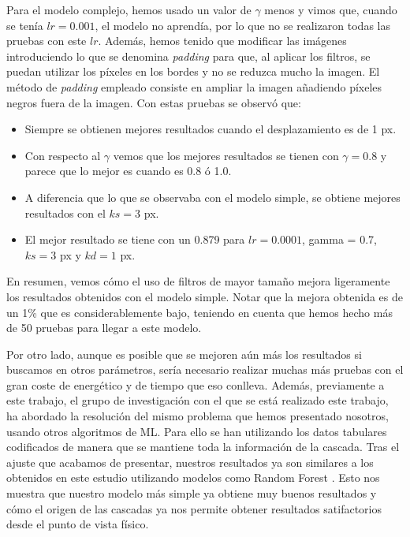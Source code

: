 \documentclass[a4paper,12pt,oneside,titlepage]{book}
\begin{document}
Para el modelo complejo, hemos usado un valor de $\gamma$ menos y vimos que, cuando se tenía $lr = 0.001$, el modelo no aprendía, por lo que no se realizaron todas las pruebas con este $lr$. Además, hemos tenido que modificar las imágenes introduciendo lo que se denomina \textit{padding} para que, al aplicar los filtros, se puedan utilizar los píxeles en los bordes y no se reduzca mucho la imagen. El método de \textit{padding} empleado consiste en ampliar la imagen añadiendo píxeles negros fuera de la imagen. Con estas pruebas se observó que:
\begin{itemize}
 
  \item Siempre se obtienen mejores resultados cuando el desplazamiento es de 1 px.
  \item Con respecto al $\gamma$ vemos que los mejores resultados se tienen con $\gamma = 0.8$ y parece que lo mejor es cuando es 0.8 ó 1.0.
  \item A diferencia que lo que se observaba con el modelo simple, se obtiene mejores resultados con el $ks = 3$ px.
  \item El mejor resultado se tiene con un 0.879 para $lr = 0.0001$, gamma = 0.7, $ks = 3$ px y $kd = 1$ px.
\end{itemize}
 
En resumen, vemos cómo el uso de filtros de mayor tamaño mejora ligeramente los resultados obtenidos con el modelo simple. Notar que la mejora obtenida es de un 1\% que es considerablemente bajo, teniendo en cuenta que hemos hecho más de 50 pruebas para llegar a este modelo.
 
Por otro lado, aunque es posible que se mejoren aún más los resultados si buscamos en otros parámetros, sería necesario realizar muchas más pruebas con el gran coste de energético y de tiempo que eso conlleva. Además, previamente a este trabajo, el grupo de investigación con el que se está realizado este trabajo, ha abordado la resolución del mismo problema que hemos presentado nosotros, usando otros algoritmos de ML. Para ello se han utilizando los datos tabulares codificados de manera que se mantiene toda la información de la cascada. Tras el ajuste que acabamos de presentar, nuestros resultados ya son similares a los obtenidos en este estudio utilizando modelos como Random Forest \cite{auu}. Esto nos muestra que nuestro modelo más simple ya obtiene muy buenos resultados y cómo el origen de las cascadas ya nos permite obtener resultados satifactorios desde el punto de vista físico.
\end{document}
